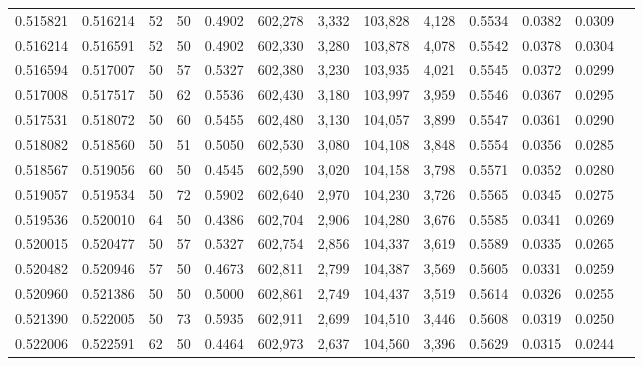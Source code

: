 \begin{tabular}{rrrrrrrrrrrrr}
0.515821 & 0.516214 &    52 &  50 &                                     0.4902 & 602,278 &   3,332 & 103,828 &   4,128 & 0.5534 & 0.0382 & 0.0309 \\
0.516214 & 0.516591 &    52 &  50 &                                     0.4902 & 602,330 &   3,280 & 103,878 &   4,078 & 0.5542 & 0.0378 & 0.0304 \\
0.516594 & 0.517007 &    50 &  57 &                                     0.5327 & 602,380 &   3,230 & 103,935 &   4,021 & 0.5545 & 0.0372 & 0.0299 \\
0.517008 & 0.517517 &    50 &  62 &                                     0.5536 & 602,430 &   3,180 & 103,997 &   3,959 & 0.5546 & 0.0367 & 0.0295 \\
0.517531 & 0.518072 &    50 &  60 &                                     0.5455 & 602,480 &   3,130 & 104,057 &   3,899 & 0.5547 & 0.0361 & 0.0290 \\
0.518082 & 0.518560 &    50 &  51 &                                     0.5050 & 602,530 &   3,080 & 104,108 &   3,848 & 0.5554 & 0.0356 & 0.0285 \\
0.518567 & 0.519056 &    60 &  50 &                                     0.4545 & 602,590 &   3,020 & 104,158 &   3,798 & 0.5571 & 0.0352 & 0.0280 \\
0.519057 & 0.519534 &    50 &  72 &                                     0.5902 & 602,640 &   2,970 & 104,230 &   3,726 & 0.5565 & 0.0345 & 0.0275 \\
0.519536 & 0.520010 &    64 &  50 &                                     0.4386 & 602,704 &   2,906 & 104,280 &   3,676 & 0.5585 & 0.0341 & 0.0269 \\
0.520015 & 0.520477 &    50 &  57 &                                     0.5327 & 602,754 &   2,856 & 104,337 &   3,619 & 0.5589 & 0.0335 & 0.0265 \\
0.520482 & 0.520946 &    57 &  50 &                                     0.4673 & 602,811 &   2,799 & 104,387 &   3,569 & 0.5605 & 0.0331 & 0.0259 \\
0.520960 & 0.521386 &    50 &  50 &                                     0.5000 & 602,861 &   2,749 & 104,437 &   3,519 & 0.5614 & 0.0326 & 0.0255 \\
0.521390 & 0.522005 &    50 &  73 &                                     0.5935 & 602,911 &   2,699 & 104,510 &   3,446 & 0.5608 & 0.0319 & 0.0250 \\
0.522006 & 0.522591 &    62 &  50 &                                     0.4464 & 602,973 &   2,637 & 104,560 &   3,396 & 0.5629 & 0.0315 & 0.0244 \\

\end{tabular}
